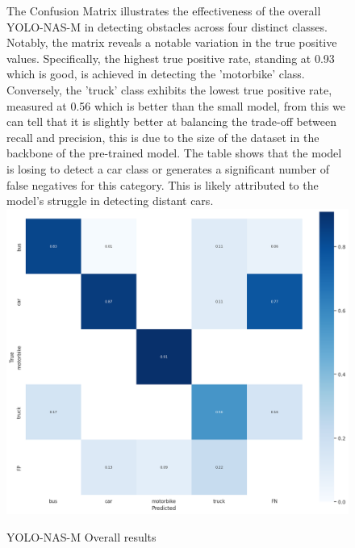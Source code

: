 \begin{figure}[H]
The Confusion Matrix illustrates the effectiveness of the overall YOLO-NAS-M in detecting obstacles across four distinct classes. Notably, the matrix reveals a notable variation in the true positive values. Specifically, the highest true positive rate, standing at 0.93 which is good, is achieved in detecting the 'motorbike' class. Conversely, the 'truck' class exhibits the lowest true positive rate, measured at 0.56 which is better than the small model, from this we can tell that it is slightly better at balancing the trade-off between recall and precision, this is due to the size of the dataset in the backbone of the pre-trained model. The table shows that the model is losing to detect a car class or generates a significant number of false negatives for this category. This is likely attributed to the model's struggle in detecting distant cars.
    \centering
    \includegraphics[width=\linewidth]{tex/img/YNM2_CM.png}
    \caption{YOLO-NAS-M Overall results }
    \label{fig:ConfusionMatrixY-N-M}
\end{figure}

